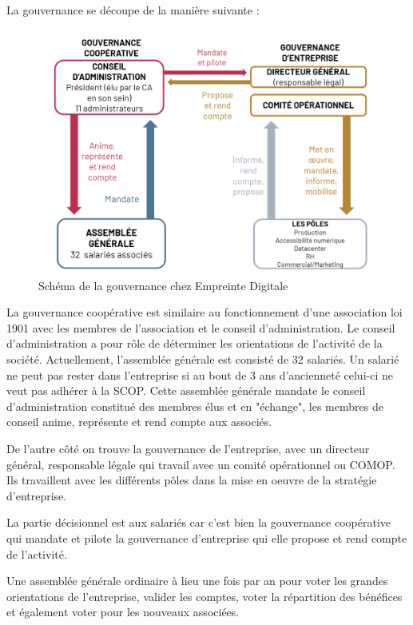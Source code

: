 \documentclass[12pt]{article}
\begin{document}
\newpage
La gouvernance se découpe de la manière suivante :
\begin{figure}[!ht]
    \centering
    \includegraphics[width=\textwidth]{src/gouvernance_ed.png}
    \caption{Schéma de la gouvernance chez Empreinte Digitale}
    \label{fig:gouvernance_ed}
\end{figure}

La gouvernance coopérative est similaire au fonctionnement d'une association loi 1901 avec les membres de l'association et le conseil d'administration. 
Le conseil d'administration a pour rôle de déterminer les orientations de l'activité de la société. 
Actuellement, l'assemblée générale est consisté de 32 salariés. 
Un salarié ne peut pas rester dans l'entreprise si au bout de 3 ans d'ancienneté celui-ci ne veut pas adhérer à la SCOP. 
Cette assemblée générale mandate le conseil d'administration constitué des membres élus et en "échange", les membres de conseil anime, représente et rend compte aux associés.

De l'autre côté on trouve la gouvernance de l'entreprise, avec un directeur général, responsable légale qui travail avec un comité opérationnel ou COMOP. 
Ils travaillent avec les différents pôles dans la mise en oeuvre de la stratégie d'entreprise.

La partie décisionnel est aux salariés car c'est bien la gouvernance coopérative qui mandate et pilote la gouvernance d'entreprise qui elle propose et rend compte de l'activité.

Une assemblée générale ordinaire à lieu une fois par an pour voter les grandes orientations de l'entreprise, valider les comptes, voter la répartition des bénéfices et également voter pour les nouveaux associées.
\end{document}
